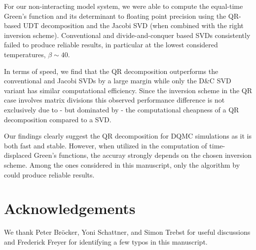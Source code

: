 \documentclass[%
 reprint,
superscriptaddress,
citeautoscript,
showpacs,
 amsmath,amssymb,
 aps,
 prb,
longbibliography,
]{revtex4-2}
\begin{document}
For our non-interacting model system, we were able to compute the equal-time Green's function and its determinant to floating point precision using the QR-based UDT decomposition and the Jacobi SVD (when combined with the right inversion scheme). Conventional and divide-and-conquer based SVDs consistently failed to produce reliable results, in particular at the lowest considered temperatures, $\beta \sim 40$.

In terms of speed, we find that the QR decomposition outperforms the conventional and Jacobi SVDs by a large margin while only the D\&C SVD variant has similar computational efficiency. Since the inversion scheme in the QR case involves matrix divisions this observed performance difference is not exclusively due to - but dominated by - the computational cheapness of a QR decomposition compared to a SVD.

Our findings clearly suggest the QR decomposition for DQMC simulations as it is both fast and stable. However, when utilized in the computation of time-displaced Green's functions, the accuray strongly depends on the chosen inversion scheme. Among the ones considered in this manuscript, only the algorithm by  ~\citet{Loh1989} could produce reliable results.

\section{Acknowledgements}

We thank Peter Bröcker, Yoni Schattner, and Simon Trebst for useful discussions and Frederick Freyer for identifying a few typos in this manuscript. %

\clearpage

\end{document}
